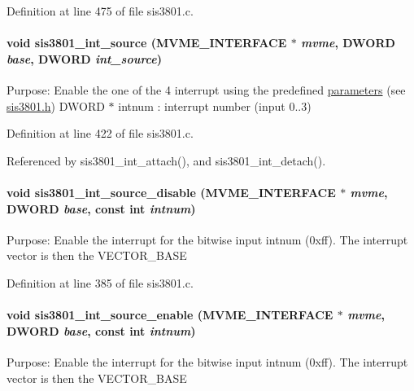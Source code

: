 Definition at line 475 of file sis3801.c.
\paragraph[{sis3801\_\-int\_\-source}]{\setlength{\rightskip}{0pt plus 5cm}void sis3801\_\-int\_\-source ({\bf MVME\_\-INTERFACE} $\ast$ {\em mvme}, \/  {\bf DWORD} {\em base}, \/  {\bf DWORD} {\em int\_\-source})}\hfill\label{sis3801_8c_aebbdd78e2820274c740be5cb75546086}
Purpose: Enable the one of the 4 interrupt using the predefined \hyperlink{structparameters}{parameters} (see \hyperlink{sis3801_8h}{sis3801.h}) DWORD $\ast$ intnum : interrupt number (input 0..3) 

Definition at line 422 of file sis3801.c.

Referenced by sis3801\_\-int\_\-attach(), and sis3801\_\-int\_\-detach().
\paragraph[{sis3801\_\-int\_\-source\_\-disable}]{\setlength{\rightskip}{0pt plus 5cm}void sis3801\_\-int\_\-source\_\-disable ({\bf MVME\_\-INTERFACE} $\ast$ {\em mvme}, \/  {\bf DWORD} {\em base}, \/  const int {\em intnum})}\hfill\label{sis3801_8c_aa0ca70723ac84258800e438bee4af17e}
Purpose: Enable the interrupt for the bitwise input intnum (0xff). The interrupt vector is then the VECTOR\_\-BASE 

Definition at line 385 of file sis3801.c.
\paragraph[{sis3801\_\-int\_\-source\_\-enable}]{\setlength{\rightskip}{0pt plus 5cm}void sis3801\_\-int\_\-source\_\-enable ({\bf MVME\_\-INTERFACE} $\ast$ {\em mvme}, \/  {\bf DWORD} {\em base}, \/  const int {\em intnum})}\hfill\label{sis3801_8c_a5058a04d28f3bd2aa05e7c1f2f91c871}
Purpose: Enable the interrupt for the bitwise input intnum (0xff). The interrupt vector is then the VECTOR\_\-BASE 

